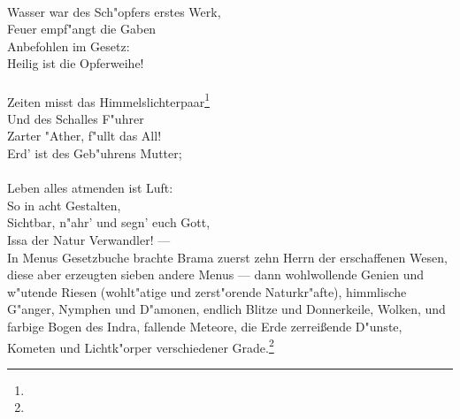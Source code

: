 \documentclass[a4paper, 11pt, oneside, polutonikogreek, german]{article}
\begin{document}
\\
Wasser war des Sch"opfers erstes Werk,\\
Feuer empf"angt die Gaben\\
Anbefohlen im Gesetz:\\
Heilig ist die Opferweihe!\\
\\
\hspace*{1cm} Zeiten misst das Himmelslichterpaar\footnote{}\\
\hspace*{1cm} Und des Schalles F"uhrer\\
\hspace*{1cm} Zarter "Ather, f"ullt das All!\\
\hspace*{1cm} Erd' ist des Geb"uhrens Mutter;\\
\\
\hspace*{2cm} Leben alles atmenden ist Luft:\\
\hspace*{2cm} So in acht Gestalten,\\
\hspace*{2cm} Sichtbar, n"ahr' und segn' euch Gott,\\
\hspace*{2cm} Issa der Natur Verwandler! ---\\

In Menus Gesetzbuche brachte Brama zuerst zehn Herrn der erschaffenen Wesen, diese aber erzeugten sieben andere Menus --- dann wohlwollende Genien und w"utende Riesen (wohlt"atige und zerst"orende Naturkr"afte), himmlische G"anger, Nymphen und D"amonen, endlich Blitze und Donnerkeile, Wolken, und farbige Bogen des Indra, fallende Meteore, die Erde zerreißende D"unste, Kometen und Lichtk"orper verschiedener Grade.\footnote{}
\end{document}
